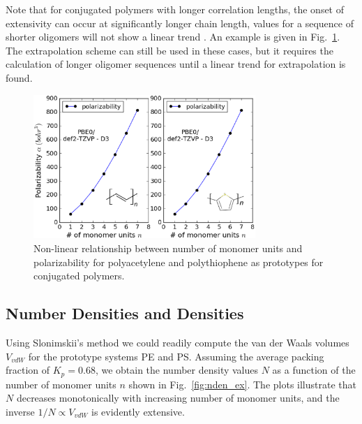 Note that for conjugated polymers with longer correlation lengths, the onset of extensivity can occur at significantly longer chain length, \ie  values for a sequence of shorter oligomers will not show a linear trend \cite{Dupuis1988,Mosley1994}. 
An example is given in Fig.\ \ref{fig:pol_non_lin}. 
The extrapolation scheme can still be used in these cases, but it requires the calculation of longer oligomer sequences until a linear trend for extrapolation is found. 

\begin{figure}[htbp] 
	\centering
	\includegraphics[width=0.75\textwidth]{Chapter-2/Figures/PA_PT_pol.eps}
	\caption{Non-linear relationship between number of monomer units and polarizability for polyacetylene and polythiophene as prototypes for conjugated polymers.} 
	\label{fig:pol_non_lin} 
\end{figure}  



\subsection{Number Densities and Densities}
\label{subsec:numberdensity_results} 
Using Slonimskii's method we could readily compute the van der Waals volumes $V_{vdW}$ for the prototype systems PE and PS. Assuming the average packing fraction of $K_p = 0.68$, we obtain the number density values $N$ as a function of the number of monomer units $n$ shown in Fig.\ \ref{fig:nden_ex}.  
The plots illustrate that $N$ decreases monotonically with increasing number of monomer units, and the inverse $1/N \propto V_{vdW}$ is evidently extensive. 


